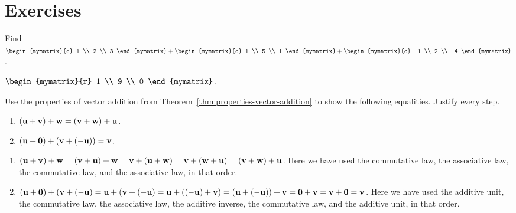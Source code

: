 \section*{Exercises}


\begin{ex}
  Find $\begin{mymatrix}{c}
    1 \\
    2 \\
    3
  \end{mymatrix} +\begin{mymatrix}{c}
    1 \\
    5 \\
    1
  \end{mymatrix} +\begin{mymatrix}{c}
    -1 \\
    2 \\
    -4
  \end{mymatrix}$.

  \begin{sol}
    $\begin{mymatrix}{r}
      1 \\
      9 \\
      0
    \end{mymatrix}$.
  \end{sol}
\end{ex}

\begin{ex}
  Use the properties of vector addition from
  Theorem~\ref{thm:properties-vector-addition} to show the following
  equalities. Justify every step.
  \begin{enumerate}
  \item $(\mbox{\bf u}+\mbox{\bf v})+\mbox{\bf w} = (\mbox{\bf v}+\mbox{\bf w})+\mbox{\bf u}$.
  \item $(\mbox{\bf u}+\mbox{\bf 0})+(\mbox{\bf v}+(-\mbox{\bf u})) = \mbox{\bf v}$.
  \end{enumerate}

  \begin{sol}
    \begin{enumerate}
    \item
      $(\mbox{\bf u}+\mbox{\bf v})+\mbox{\bf w} = (\mbox{\bf v}+\mbox{\bf u})+\mbox{\bf w} =
      \mbox{\bf v}+(\mbox{\bf u}+\mbox{\bf w}) = \mbox{\bf v}+(\mbox{\bf w}+\mbox{\bf u}) =
      (\mbox{\bf v}+\mbox{\bf w})+\mbox{\bf u}$. Here we have used the commutative
      law, the associative law, the commutative law, and the
      associative law, in that order.
    \item
      $(\mbox{\bf u}+\mbox{\bf 0})+(\mbox{\bf v}+(-\mbox{\bf u}) =
      \mbox{\bf u}+(\mbox{\bf v}+(-\mbox{\bf u}) = \mbox{\bf u}+((-\mbox{\bf u})+\mbox{\bf v})
      = (\mbox{\bf u}+(-\mbox{\bf u}))+\mbox{\bf v} = \mbox{\bf 0}+\mbox{\bf v} =
      \mbox{\bf v}+\mbox{\bf 0} = \mbox{\bf v}$. Here we have used the additive
      unit, the commutative law, the associative law, the additive
      inverse, the commutative law, and the additive unit, in that
      order.
    \end{enumerate}
  \end{sol}
\end{ex}

